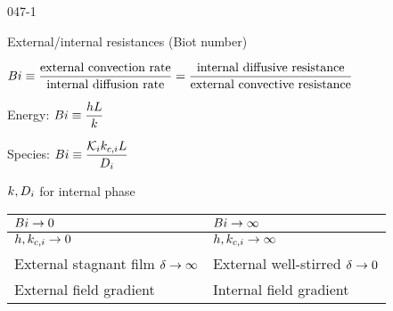 \begin{mitframe}{047-1} 


\begin{listone}

	\item External/internal resistances (Biot number)
    
    \begin{listtwo}
	
    	\item $\biot \equiv \dfrac{\text{external convection rate}}{\text{internal diffusion  rate}}=\dfrac{\text{internal diffusive resistance}}{\text{external convective resistance}}$
        
        \item Energy: $\biot \equiv \dfrac{\planck\length}{\thermcond}$
        
        \item Species: $\biot \equiv \dfrac{\partcoeff\masstranscoeff\length}{\pdiff} $
        
        \item $\thermcond, \pdiff$ for internal phase

	\end{listtwo}

\begin{center}
\begin{tabular}
{| >{\centering\arraybackslash}m{4cm} | >{\centering\arraybackslash}m{4cm} |}
\hline 
 
$\biot \rightarrow 0$ &%
$\biot \rightarrow \infty$\\ \hline

$\planck,\masstranscoeff \rightarrow 0$ &%
$\planck,\masstranscoeff \rightarrow \infty$ \\ \hline

External stagnant film $\blthick \rightarrow \infty$  &%
External well-stirred $\blthick \rightarrow 0$ \\ \hline

External field gradient &%
Internal field gradient \\ \hline    
 
\end{tabular}
\end{center}

\end{listone}

\end{mitframe}